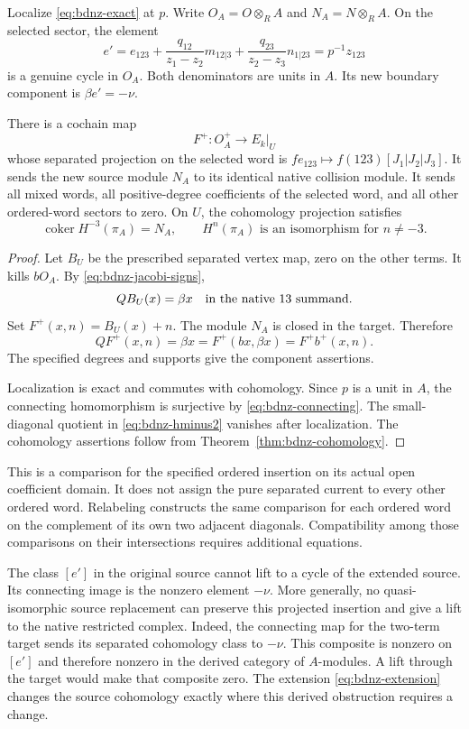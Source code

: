 Localize \eqref{eq:bdnz-exact} at $p$.
Write $O_A=O\otimes_R A$ and $N_A=N\otimes_R A$.
On the selected sector, the element
\begin{equation}\label{eq:bdnz-open-cycle}
 e'=e_{123}+\frac{q_{12}}{z_1-z_2}m_{12|3}
              +\frac{q_{23}}{z_2-z_3}n_{1|23}
       =p^{-1}z_{123}
\end{equation}
is a genuine cycle in $O_A$.
Both denominators are units in $A$.
Its new boundary component is $\beta e'=-\nu$.

\begin{theorem}\label{thm:bdnz-native-map}
There is a cochain map
\[
 F^+:O_A^+\longrightarrow E_k|_U
\]
whose separated projection on the selected word is
$fe_{123}\mapsto f(123)[J_1|J_2|J_3]$.
It sends the new source module $N_A$ to its identical native collision module.
It sends all mixed words, all positive-degree coefficients of the selected word, and all other ordered-word sectors to zero.
On $U$, the cohomology projection satisfies
\[
 \operatorname{coker}H^{-3}(\pi_A)=N_A,
 \qquad H^n(\pi_A)\text{ is an isomorphism for }n\ne-3.
\]
\end{theorem}
\begin{proof}
Let $B_U$ be the prescribed separated vertex map, zero on the other terms.
It kills $bO_A$.
By \eqref{eq:bdnz-jacobi-signs},
\[
 QB_U(x)=\beta x\quad\hbox{in the native }13\hbox{ summand}.
\]
Set $F^+(x,n)=B_U(x)+n$.
The module $N_A$ is closed in the target.
Therefore
\[
 QF^+(x,n)=\beta x=F^+(bx,\beta x)=F^+b^+(x,n).
\]
The specified degrees and supports give the component assertions.

Localization is exact and commutes with cohomology.
Since $p$ is a unit in $A$, the connecting homomorphism is surjective by \eqref{eq:bdnz-connecting}.
The small-diagonal quotient in \eqref{eq:bdnz-hminus2} vanishes after localization.
The cohomology assertions follow from Theorem~\ref{thm:bdnz-cohomology}.
\end{proof}

This is a comparison for the specified ordered insertion on its actual open coefficient domain.
It does not assign the pure separated current to every other ordered word.
Relabeling constructs the same comparison for each ordered word on the complement of its own two adjacent diagonals.
Compatibility among those comparisons on their intersections requires additional equations.

The class $[e']$ in the original source cannot lift to a cycle of the extended source.
Its connecting image is the nonzero element $-\nu$.
More generally, no quasi-isomorphic source replacement can preserve this projected insertion and give a lift to the native restricted complex.
Indeed, the connecting map for the two-term target sends its separated cohomology class to $-\nu$.
This composite is nonzero on $[e']$ and therefore nonzero in the derived category of $A$-modules.
A lift through the target would make that composite zero.
The extension \eqref{eq:bdnz-extension} changes the source cohomology exactly where this derived obstruction requires a change.

